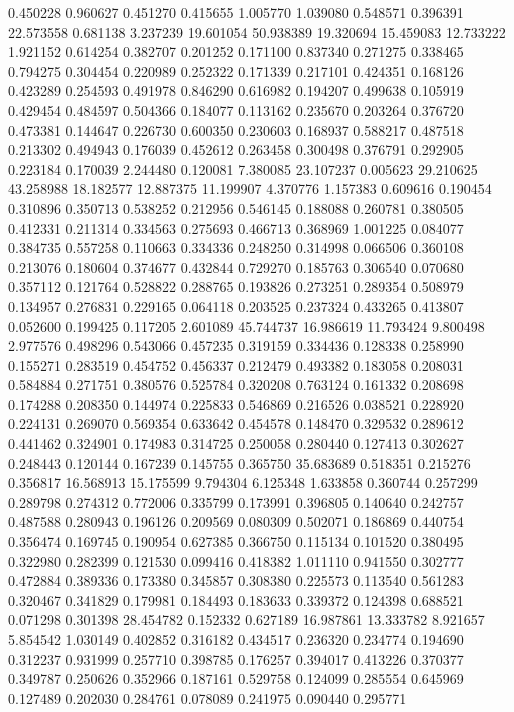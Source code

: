 0.450228
0.960627
0.451270
0.415655
1.005770
1.039080
0.548571
0.396391
22.573558
0.681138
3.237239
19.601054
50.938389
19.320694
15.459083
12.733222
1.921152
0.614254
0.382707
0.201252
0.171100
0.837340
0.271275
0.338465
0.794275
0.304454
0.220989
0.252322
0.171339
0.217101
0.424351
0.168126
0.423289
0.254593
0.491978
0.846290
0.616982
0.194207
0.499638
0.105919
0.429454
0.484597
0.504366
0.184077
0.113162
0.235670
0.203264
0.376720
0.473381
0.144647
0.226730
0.600350
0.230603
0.168937
0.588217
0.487518
0.213302
0.494943
0.176039
0.452612
0.263458
0.300498
0.376791
0.292905
0.223184
0.170039
2.244480
0.120081
7.380085
23.107237
0.005623
29.210625
43.258988
18.182577
12.887375
11.199907
4.370776
1.157383
0.609616
0.190454
0.310896
0.350713
0.538252
0.212956
0.546145
0.188088
0.260781
0.380505
0.412331
0.211314
0.334563
0.275693
0.466713
0.368969
1.001225
0.084077
0.384735
0.557258
0.110663
0.334336
0.248250
0.314998
0.066506
0.360108
0.213076
0.180604
0.374677
0.432844
0.729270
0.185763
0.306540
0.070680
0.357112
0.121764
0.528822
0.288765
0.193826
0.273251
0.289354
0.508979
0.134957
0.276831
0.229165
0.064118
0.203525
0.237324
0.433265
0.413807
0.052600
0.199425
0.117205
2.601089
45.744737
16.986619
11.793424
9.800498
2.977576
0.498296
0.543066
0.457235
0.319159
0.334436
0.128338
0.258990
0.155271
0.283519
0.454752
0.456337
0.212479
0.493382
0.183058
0.208031
0.584884
0.271751
0.380576
0.525784
0.320208
0.763124
0.161332
0.208698
0.174288
0.208350
0.144974
0.225833
0.546869
0.216526
0.038521
0.228920
0.224131
0.269070
0.569354
0.633642
0.454578
0.148470
0.329532
0.289612
0.441462
0.324901
0.174983
0.314725
0.250058
0.280440
0.127413
0.302627
0.248443
0.120144
0.167239
0.145755
0.365750
35.683689
0.518351
0.215276
0.356817
16.568913
15.175599
9.794304
6.125348
1.633858
0.360744
0.257299
0.289798
0.274312
0.772006
0.335799
0.173991
0.396805
0.140640
0.242757
0.487588
0.280943
0.196126
0.209569
0.080309
0.502071
0.186869
0.440754
0.356474
0.169745
0.190954
0.627385
0.366750
0.115134
0.101520
0.380495
0.322980
0.282399
0.121530
0.099416
0.418382
1.011110
0.941550
0.302777
0.472884
0.389336
0.173380
0.345857
0.308380
0.225573
0.113540
0.561283
0.320467
0.341829
0.179981
0.184493
0.183633
0.339372
0.124398
0.688521
0.071298
0.301398
28.454782
0.152332
0.627189
16.987861
13.333782
8.921657
5.854542
1.030149
0.402852
0.316182
0.434517
0.236320
0.234774
0.194690
0.312237
0.931999
0.257710
0.398785
0.176257
0.394017
0.413226
0.370377
0.349787
0.250626
0.352966
0.187161
0.529758
0.124099
0.285554
0.645969
0.127489
0.202030
0.284761
0.078089
0.241975
0.090440
0.295771
